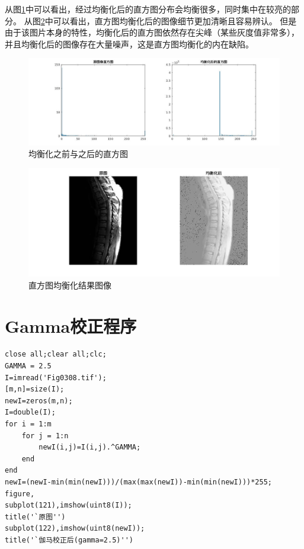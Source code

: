 \documentclass[logo,reportComp]{thesis}
\begin{document}
从图\ref{fig:histogram}中可以看出，经过均衡化后的直方图分布会均衡很多，同时集中在较亮的部分。
从图\ref{fig:result}中可以看出，直方图均衡化后的图像细节更加清晰且容易辨认。
但是由于该图片本身的特性，均衡化后的直方图依然存在尖峰（某些灰度值非常多），并且均衡化后的图像存在大量噪声，这是直方图均衡化的内在缺陷。
\begin{figure}[H]
\centering
\includegraphics[width=\linewidth,trim=10 10 10 10,clip]{fig/histogram.jpg}
\caption{均衡化之前与之后的直方图}
\label{fig:histogram}
\end{figure}
\begin{figure}[H]
\centering
\includegraphics[width=\linewidth,trim=10 10 10 10,clip]{fig/result.jpg}
\caption{直方图均衡化结果图像}
\label{fig:result}
\end{figure}

\appendix\appendixconfig
\section{Gamma校正程序}
\begin{lstlisting}
close all;clear all;clc;
GAMMA = 2.5
I=imread('Fig0308.tif');
[m,n]=size(I);
newI=zeros(m,n);
I=double(I);
for i = 1:m
    for j = 1:n
        newI(i,j)=I(i,j).^GAMMA;
    end
end
newI=(newI-min(min(newI)))/(max(max(newI))-min(min(newI)))*255;
figure,
subplot(121),imshow(uint8(I));
title('`原图'')
subplot(122),imshow(uint8(newI));
title('`伽马校正后(gamma=2.5)'')
\end{lstlisting}
\end{document}

